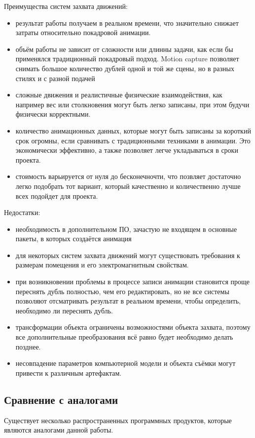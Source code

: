 Преимущества систем захвата движений:
\begin{itemize}
	\item результат работы получаем в реальном времени, что значительно снижает затраты относительно покадровой анимации.
	\item объём работы не зависит от сложности или длинны задачи, как если бы применялся традиционный покадровый подход. Motion capture позволяет снимать большое количество дублей одной и той же сцены, но в разных стилях и с разной подачей
	\item сложные движения и реалистичные физические взаимодействия, как например вес или столкновения могут быть легко записаны, при этом будучи физически корректными.
	\item количество анимационных данных, которые могут быть записаны за короткий срок огромны, если сравнивать с традиционными техниками в анимации. Это экономически эффективно, а также позволяет легче укладываться в сроки проекта.
	\item стоимость варьируется от нуля до бесконечночти, что позвляет достаточно легко подобрать тот вариант, который качественно и количественно лучше всех подойдет для проекта.
\end{itemize}

Недостатки:
\begin{itemize}
	\item необходимость в дополнительном ПО, зачастую не входящем в основные пакеты, в которых создаётся анимация
	\item для некоторых систем захвата движений могут существовать требования к размерам помещения и его электромагнитным свойствам.
	\item при возникновении проблемы в процессе записи анимации становится проще переснять дубль полностью, чем его редактировать, но не все системы позволяют отсматривать результат в реальном времени, чтобы определить, необходимо ли переснять дубль.
	\item трансформации объекта ограничены возможностями объекта захвата, поэтому все дополнительные преобразования всё равно будет необходимо делать позднее.
	\item несовпадение параметров компьютерной модели и объекта съёмки могут привести к различным артефактам.
\end{itemize}



\subsection{Сравнение с аналогами}
Существует несколько распространенных программных продуктов, которые являются аналогами данной работы.


